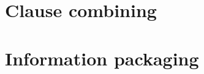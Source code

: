 \documentclass[UTF8, a4paper, oneside, scheme=plain]{ctexart}
\begin{document}
\section{Clause combining}

\section{Information packaging}




\end{document}
